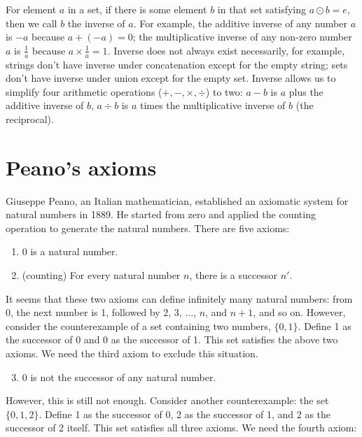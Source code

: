 \documentclass[b5paper]{article}
\begin{document}
For element $a$ in a set, if there is some element $b$ in that set satisfying $a \odot b = e$, then we call $b$ the inverse of $a$. For example, the additive inverse of any number $a$ is $-a$ because $a + (-a) = 0$; the multiplicative inverse of any non-zero number $a$ is $\frac{1}{a}$ because $a \times \frac{1}{a} = 1$. Inverse does not always exist necessarily, for example, strings don't have inverse under concatenation except for the empty string; sets don't have inverse under union except for the empty set. Inverse allows us to simplify four arithmetic operations ($+, -, \times, \div$) to two: $a - b$ is $a$ plus the additive inverse of $b$, $a \div b$ is $a$ times the multiplicative inverse of $b$ (the reciprocal).

\section{Peano's axioms}
\label{sec:peano-axioms}
Giuseppe Peano, an Italian mathematician, established an axiomatic system for natural numbers in 1889. He started from zero and applied the counting operation to generate the natural numbers. There are five axioms:

\begin{enumerate}[{Axiom} (1)]
\item 0 is a natural number.
\item (counting) For every natural number $n$, there is a successor $n'$.
\end{enumerate}

It seems that these two axioms can define infinitely many natural numbers: from 0, the next number is 1, followed by 2, 3, ..., $n$, and $n + 1$, and so on. However, consider the counterexample of a set containing two numbers, $\{0, 1\}$. Define 1 as the successor of 0 and 0 as the successor of 1. This set satisfies the above two axioms. We need the third axiom to exclude this situation.

\begin{enumerate}[{Axiom} (1)]
  \setcounter{enumi}{2}
  \item 0 is not the successor of any natural number.
\end{enumerate}

However, this is still not enough. Consider another counterexample: the set $\{0, 1, 2\}$. Define 1 as the successor of 0, 2 as the successor of 1, and 2 as the successor of 2 itself. This set satisfies all three axioms. We need the fourth axiom:
\end{document}

